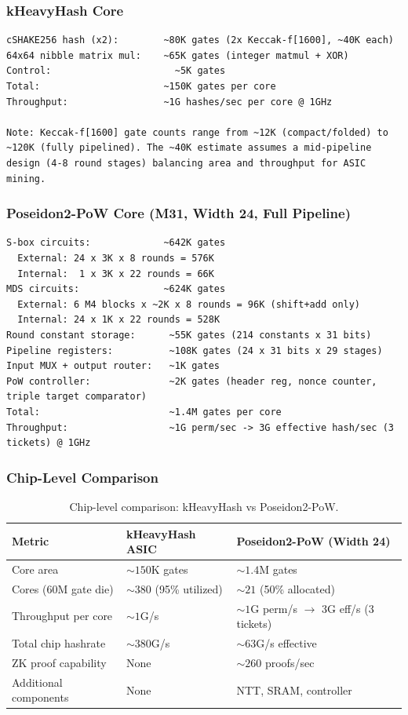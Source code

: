 \documentclass[11pt,a4paper]{article}
\begin{document}
\subsubsection{kHeavyHash Core}
\begin{Verbatim}[fontsize=\small]
cSHAKE256 hash (x2):        ~80K gates (2x Keccak-f[1600], ~40K each)
64x64 nibble matrix mul:    ~65K gates (integer matmul + XOR)
Control:                      ~5K gates
Total:                      ~150K gates per core
Throughput:                 ~1G hashes/sec per core @ 1GHz

Note: Keccak-f[1600] gate counts range from ~12K (compact/folded) to
~120K (fully pipelined). The ~40K estimate assumes a mid-pipeline
design (4-8 round stages) balancing area and throughput for ASIC mining.
\end{Verbatim}

\subsubsection{Poseidon2-PoW Core (M31, Width 24, Full Pipeline)}
\begin{Verbatim}[fontsize=\small]
S-box circuits:             ~642K gates
  External: 24 x 3K x 8 rounds = 576K
  Internal:  1 x 3K x 22 rounds = 66K
MDS circuits:               ~624K gates
  External: 6 M4 blocks x ~2K x 8 rounds = 96K (shift+add only)
  Internal: 24 x 1K x 22 rounds = 528K
Round constant storage:      ~55K gates (214 constants x 31 bits)
Pipeline registers:          ~108K gates (24 x 31 bits x 29 stages)
Input MUX + output router:   ~1K gates
PoW controller:              ~2K gates (header reg, nonce counter, triple target comparator)
Total:                       ~1.4M gates per core
Throughput:                  ~1G perm/sec -> 3G effective hash/sec (3 tickets) @ 1GHz
\end{Verbatim}

\subsubsection{Chip-Level Comparison}

\begin{table}[h]
\centering
\small
\begin{tabular}{@{}lll@{}}
\toprule
Metric & kHeavyHash ASIC & Poseidon2-PoW (Width 24) \\
\midrule
Core area & ${\sim}150$K gates & ${\sim}1.4$M gates \\
Cores (60M gate die) & ${\sim}380$ (95\% utilized) & ${\sim}21$ (50\% allocated) \\
Throughput per core & ${\sim}1$G/s & ${\sim}1$G perm/s $\to$ 3G eff/s (3 tickets) \\
Total chip hashrate & ${\sim}380$G/s & ${\sim}63$G/s effective \\
ZK proof capability & None & ${\sim}260$ proofs/sec \\
Additional components & None & NTT, SRAM, controller \\
\bottomrule
\end{tabular}
\caption{Chip-level comparison: kHeavyHash vs Poseidon2-PoW.}
\label{tab:chip}
\end{table}
\end{document}
